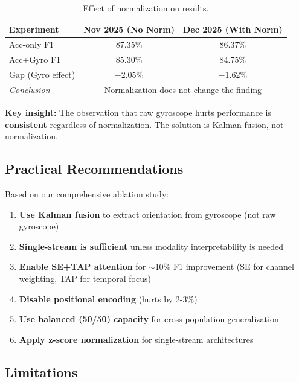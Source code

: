 \documentclass{article}
\begin{document}
\begin{table}[htbp]
    \centering
    \caption{Effect of normalization on results.}
    \label{tab:norm_comparison}
    \begin{tabular}{lcc}
        \toprule
        \textbf{Experiment} & \textbf{Nov 2025 (No Norm)} & \textbf{Dec 2025 (With Norm)} \\
        \midrule
        Acc-only F1 & 87.35\% & 86.37\% \\
        Acc+Gyro F1 & 85.30\% & 84.75\% \\
        Gap (Gyro effect) & $-$2.05\% & $-$1.62\% \\
        \midrule
        \textit{Conclusion} & \multicolumn{2}{c}{Normalization does not change the finding} \\
        \bottomrule
    \end{tabular}
\end{table}

\textbf{Key insight:} The observation that raw gyroscope hurts performance is \textbf{consistent} regardless of normalization. The solution is Kalman fusion, not normalization.

\subsection{Practical Recommendations}

Based on our comprehensive ablation study:

\begin{enumerate}
    \item \textbf{Use Kalman fusion} to extract orientation from gyroscope (not raw gyroscope)
    \item \textbf{Single-stream is sufficient} unless modality interpretability is needed
    \item \textbf{Enable SE+TAP attention} for $\sim$10\% F1 improvement (SE for channel weighting, TAP for temporal focus)
    \item \textbf{Disable positional encoding} (hurts by 2-3\%)
    \item \textbf{Use balanced (50/50) capacity} for cross-population generalization
    \item \textbf{Apply z-score normalization} for single-stream architectures
\end{enumerate}

\subsection{Limitations}
\end{document}

